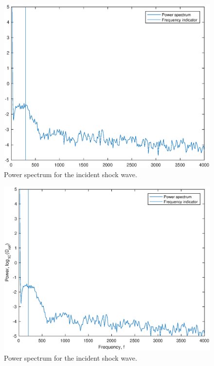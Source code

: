 \documentclass[a4paper,10pt,twoside]{article}
\begin{document}
\begin{multicols}{2}
\begin{figure}[H]
    \centering
    \includegraphics[width=\linewidth]{verlowresinc.eps}
    \caption{Power spectrum for the incident shock wave.}
    \label{fig:my_label}
\end{figure}



\begin{figure}[H]
    \centering
    \includegraphics[width=\linewidth]{vertlowresref.eps}
    \caption{Power spectrum for the incident shock wave.}
    \label{fig:my_label}
\end{figure}




\end{multicols}
\end{document}
